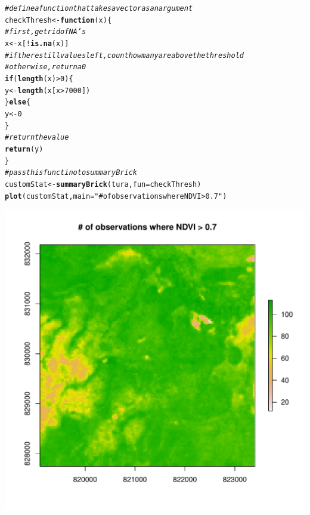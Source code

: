 \documentclass{article}\usepackage[]{graphicx}\usepackage[]{color}
\makeatletter
\def\maxwidth{ %
  \ifdim\Gin@nat@width>\linewidth
    \linewidth
  \else
    \Gin@nat@width
  \fi
}
\newcommand{\hlnum}[1]{\textcolor[rgb]{0.686,0.059,0.569}{#1}}%
\newcommand{\hlstr}[1]{\textcolor[rgb]{0.192,0.494,0.8}{#1}}%
\newcommand{\hlcom}[1]{\textcolor[rgb]{0.678,0.584,0.686}{\textit{#1}}}%
\newcommand{\hlopt}[1]{\textcolor[rgb]{0,0,0}{#1}}%
\newcommand{\hlstd}[1]{\textcolor[rgb]{0.345,0.345,0.345}{#1}}%
\newcommand{\hlkwa}[1]{\textcolor[rgb]{0.161,0.373,0.58}{\textbf{#1}}}%
\newcommand{\hlkwb}[1]{\textcolor[rgb]{0.69,0.353,0.396}{#1}}%
\newcommand{\hlkwc}[1]{\textcolor[rgb]{0.333,0.667,0.333}{#1}}%
\newcommand{\hlkwd}[1]{\textcolor[rgb]{0.737,0.353,0.396}{\textbf{#1}}}%
\newenvironment{kframe}{%
 \def\at@end@of@kframe{}%
 \ifinner\ifhmode%
  \def\at@end@of@kframe{\end{minipage}}%
  \begin{minipage}{\columnwidth}%
 \fi\fi%
 \def\FrameCommand##1{\hskip\@totalleftmargin \hskip-\fboxsep
 \colorbox{shadecolor}{##1}\hskip-\fboxsep
     \hskip-\linewidth \hskip-\@totalleftmargin \hskip\columnwidth}%
 \MakeFramed {\advance\hsize-\width
   \@totalleftmargin\z@ \linewidth\hsize
   \@setminipage}}%
 {\par\unskip\endMakeFramed%
 \at@end@of@kframe}
\newenvironment{knitrout}{}{} %
\makeatother
\begin{document}
\begin{knitrout}
\color{fgcolor}\begin{kframe}
\begin{alltt}
\hlcom{# define a function that takes a vector as an argument}
\hlstd{checkThresh} \hlkwb{<-} \hlkwa{function}\hlstd{(}\hlkwc{x}\hlstd{) \{}
    \hlcom{# first, get rid of NA's}
    \hlstd{x} \hlkwb{<-} \hlstd{x[}\hlopt{!}\hlkwd{is.na}\hlstd{(x)]}
    \hlcom{# if there still values left, count how many are above the threshold}
    \hlcom{# otherwise, return a 0}
    \hlkwa{if} \hlstd{(}\hlkwd{length}\hlstd{(x)} \hlopt{>} \hlnum{0}\hlstd{) \{}
        \hlstd{y} \hlkwb{<-} \hlkwd{length}\hlstd{(x[x} \hlopt{>} \hlnum{7000}\hlstd{])}
    \hlstd{\}} \hlkwa{else} \hlstd{\{}
        \hlstd{y} \hlkwb{<-} \hlnum{0}
    \hlstd{\}}
    \hlcom{# return the value}
    \hlkwd{return}\hlstd{(y)}
\hlstd{\}}
\hlcom{# pass this functino to summaryBrick}
\hlstd{customStat} \hlkwb{<-} \hlkwd{summaryBrick}\hlstd{(tura,} \hlkwc{fun} \hlstd{= checkThresh)}
\hlkwd{plot}\hlstd{(customStat,} \hlkwc{main} \hlstd{=} \hlstr{"# of observations where NDVI > 0.7"}\hlstd{)}
\end{alltt}
\end{kframe}
\includegraphics[width=\maxwidth]{figure/summaryBrick-custom} 

\end{knitrout}
\end{document}
